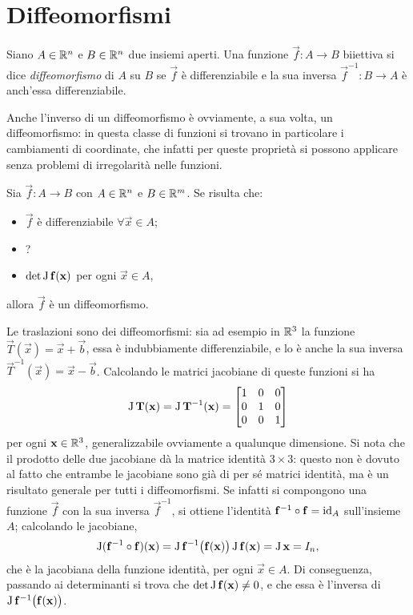\section{Diffeomorfismi}
\begin{definizione} \label{d:diffeomorfismo}
Siano $A\in\R^n$ e $B\in\R^n$ due insiemi aperti. Una funzione $\vec f\colon A\to B$ biiettiva si dice \emph{diffeomorfismo} di $A$ su $B$ se $\vec f$ è differenziabile e la sua inversa $\vec f^{-1}\colon B\to A$ è anch'essa differenziabile.
\end{definizione}
Anche l'inverso di un diffeomorfismo è ovviamente, a sua volta, un diffeomorfismo: in questa classe di funzioni si trovano in particolare i cambiamenti di coordinate, che infatti per queste proprietà si possono applicare senza problemi di irregolarità nelle funzioni.
\begin{teorema}
Sia $\vec f\colon A\to B$ con $A\in\R^n$ e $B\in\R^m$. Se risulta che:
\begin{itemize}
	\item $\vec f$ è differenziabile $\forall\vec x\in A$;
	\item ?
	\item $\det\jac\vec f(\vec x)$ per ogni $\vec x\in A$,
\end{itemize}
allora $\vec f$ è un diffeomorfismo.
\end{teorema}
Le traslazioni sono dei diffeomorfismi: sia ad esempio in $\R^3$ la funzione $\vec T(\vec x)=\vec x+\vec b$, essa è indubbiamente differenziabile, e lo è anche la sua inversa $\vec T^{-1}(\vec x)=\vec x-\vec b$.
Calcolando le matrici jacobiane di queste funzioni si ha
\[
\jac\vec T(\vec x)=\jac\vec T^{-1}(\vec x)=\begin{bmatrix}
1&0&0\\0&1&0\\0&0&1
\end{bmatrix}
\]
per ogni $\vec x\in\R^3$, generalizzabile ovviamente a qualunque dimensione.
Si nota che il prodotto delle due jacobiane dà la matrice identità $3\times 3$: questo non è dovuto al fatto che entrambe le jacobiane sono già di per sé matrici identità, ma è un risultato generale per tutti i diffeomorfismi. Se infatti si compongono una funzione $\vec f$ con la sua inversa $\vec f^{-1}$, si ottiene l'identità $\vec f^{-1}\circ\vec f=\textup{id}_A$ sull'insieme $A$; calcolando le jacobiane,
\[
\jac(\vec f^{-1}\circ\vec f)(\vec x)=\jac\vec f^{-1}\big(\vec f(\vec x)\big)\jac \vec f(\vec x)=\jac\vec x=I_n,
\]
che è la jacobiana della funzione identità, per ogni $\vec x\in A$. Di conseguenza, passando ai determinanti si trova che $\det\jac \vec f(\vec x)\neq 0$, e che essa è l'inversa di $\jac\vec f^{-1}\big(\vec f(\vec x)\big)$.

